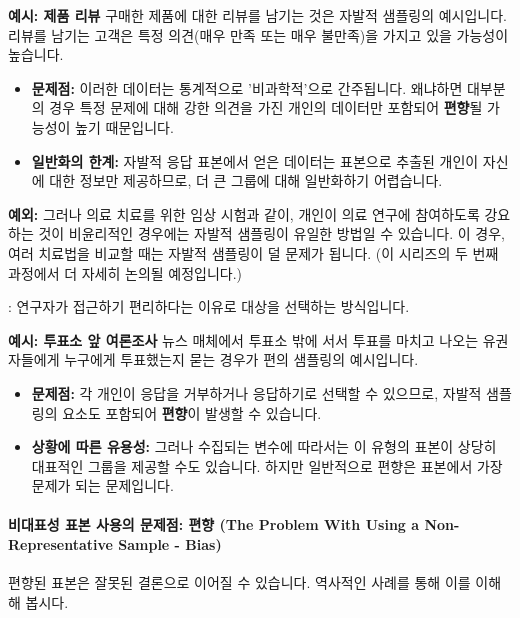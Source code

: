 \documentclass[11pt,a4paper]{article}
\theoremstyle{definition}
\begin{document}
\begin{examplebox}
\textbf{예시: 제품 리뷰}
구매한 제품에 대한 리뷰를 남기는 것은 자발적 샘플링의 예시입니다. 리뷰를 남기는 고객은 특정 의견(매우 만족 또는 매우 불만족)을 가지고 있을 가능성이 높습니다.
\begin{itemize}
    \item \textbf{문제점:} 이러한 데이터는 통계적으로 '비과학적'으로 간주됩니다. 왜냐하면 대부분의 경우 특정 문제에 대해 강한 의견을 가진 개인의 데이터만 포함되어 \textbf{편향}될 가능성이 높기 때문입니다.
    \item \textbf{일반화의 한계:} 자발적 응답 표본에서 얻은 데이터는 표본으로 추출된 개인이 자신에 대한 정보만 제공하므로, 더 큰 그룹에 대해 일반화하기 어렵습니다.
\end{itemize}
\textbf{예외:} 그러나 의료 치료를 위한 임상 시험과 같이, 개인이 의료 연구에 참여하도록 강요하는 것이 비윤리적인 경우에는 자발적 샘플링이 유일한 방법일 수 있습니다. 이 경우, 여러 치료법을 비교할 때는 자발적 샘플링이 덜 문제가 됩니다. (이 시리즈의 두 번째 과정에서 더 자세히 논의될 예정입니다.)
\end{examplebox}

\begin{tcolorbox}[infobox, title={비확률 방법 (2/2): 편의 샘플링 (Convenience Sampling)}]
: 연구자가 접근하기 편리하다는 이유로 대상을 선택하는 방식입니다.
\end{tcolorbox}

\begin{examplebox}
\textbf{예시: 투표소 앞 여론조사}
뉴스 매체에서 투표소 밖에 서서 투표를 마치고 나오는 유권자들에게 누구에게 투표했는지 묻는 경우가 편의 샘플링의 예시입니다.
\begin{itemize}
    \item \textbf{문제점:} 각 개인이 응답을 거부하거나 응답하기로 선택할 수 있으므로, 자발적 샘플링의 요소도 포함되어 \textbf{편향}이 발생할 수 있습니다.
    \item \textbf{상황에 따른 유용성:} 그러나 수집되는 변수에 따라서는 이 유형의 표본이 상당히 대표적인 그룹을 제공할 수도 있습니다. 하지만 일반적으로 편향은 표본에서 가장 문제가 되는 문제입니다.
\end{itemize}
\end{examplebox}

\paragraph{비대표성 표본 사용의 문제점: 편향 (The Problem With Using a Non-Representative Sample - Bias)}
편향된 표본은 잘못된 결론으로 이어질 수 있습니다. 역사적인 사례를 통해 이를 이해해 봅시다.
\end{document}
